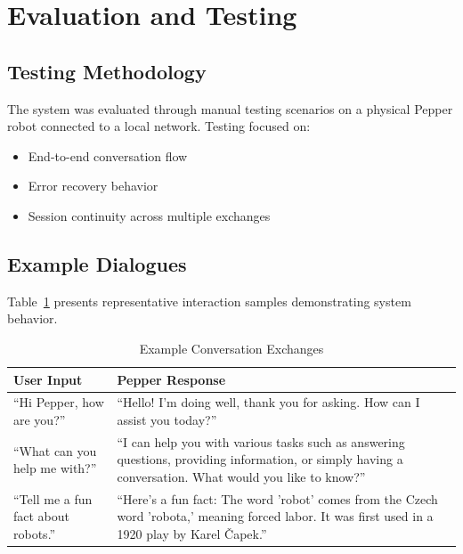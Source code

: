 \documentclass[a4paper]{article}
\begin{document}
\section{Evaluation and Testing}

\subsection{Testing Methodology}

The system was evaluated through manual testing scenarios on a physical Pepper robot connected to a local network. Testing focused on:

\begin{itemize}[noitemsep]
    \item End-to-end conversation flow
    \item Error recovery behavior
    \item Session continuity across multiple exchanges
\end{itemize}

\subsection{Example Dialogues}

Table~\ref{tab:dialogues} presents representative interaction samples demonstrating system behavior.

\begin{table}[htbp]
    \centering
    \caption{Example Conversation Exchanges}
    \label{tab:dialogues}
    \begin{tabular}{@{}p{5cm}p{8cm}@{}}
        \toprule
        \textbf{User Input} & \textbf{Pepper Response} \\
        \midrule
        ``Hi Pepper, how are you?'' & ``Hello! I'm doing well, thank you for asking. How can I assist you today?'' \\
        \midrule
        ``What can you help me with?'' & ``I can help you with various tasks such as answering questions, providing information, or simply having a conversation. What would you like to know?'' \\
        \midrule
        ``Tell me a fun fact about robots.'' & ``Here's a fun fact: The word 'robot' comes from the Czech word 'robota,' meaning forced labor. It was first used in a 1920 play by Karel Čapek.'' \\
        \bottomrule
    \end{tabular}
\end{table}
\end{document}

